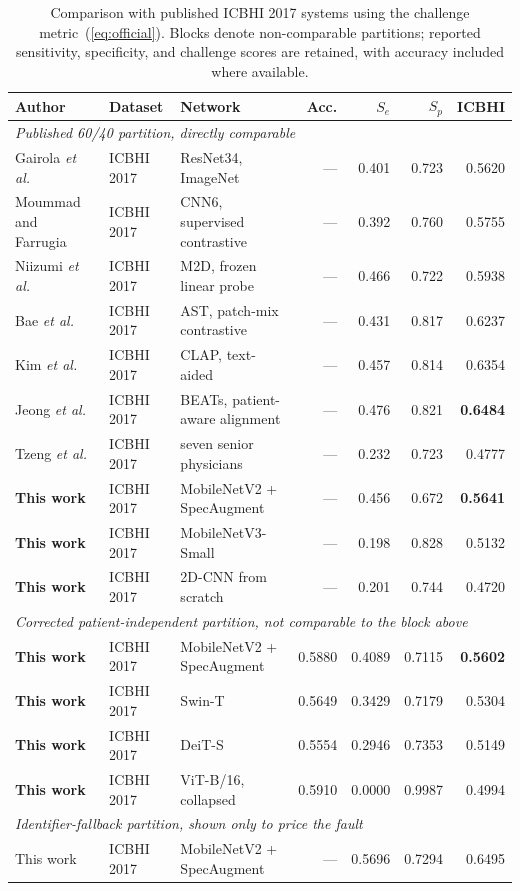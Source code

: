 \documentclass[journal,onecolumn]{IEEEtran}
\newcommand{\best}[1]{\textbf{#1}}
\begin{document}
\begin{table}[hbtp]
\centering
\caption{Comparison with published ICBHI 2017 systems using the challenge metric~(\ref{eq:official}). Blocks denote non-comparable partitions; reported sensitivity, specificity, and challenge scores are retained, with accuracy included where available.}
\label{tab:comparison}
\footnotesize
\begin{tabular}{lllrrrr}
\toprule
Author & Dataset & Network & Acc. & $S_e$ & $S_p$ & \best{ICBHI} \\
\midrule
\multicolumn{7}{l}{\emph{Published 60/40 partition, directly comparable}}\\
Gairola \emph{et al.}~\cite{respirenet2021} & ICBHI 2017 & ResNet34, ImageNet & --- & 0.401 & 0.723 & 0.5620 \\
Moummad and Farrugia~\cite{scl2023} & ICBHI 2017 & CNN6, supervised contrastive & --- & 0.392 & 0.760 & 0.5755 \\
Niizumi \emph{et al.}~\cite{frozenfm2025} & ICBHI 2017 & M2D, frozen linear probe & --- & 0.466 & 0.722 & 0.5938 \\
Bae \emph{et al.}~\cite{bae2023patchmix} & ICBHI 2017 & AST, patch-mix contrastive & --- & 0.431 & 0.817 & 0.6237 \\
Kim \emph{et al.}~\cite{bts2024} & ICBHI 2017 & CLAP, text-aided & --- & 0.457 & 0.814 & 0.6354 \\
Jeong \emph{et al.}~\cite{pafa2025} & ICBHI 2017 & BEATs, patient-aware alignment & --- & 0.476 & 0.821 & \best{0.6484} \\
Tzeng \emph{et al.}~\cite{tzeng2025jmir} & ICBHI 2017 & seven senior physicians & --- & 0.232 & 0.723 & 0.4777 \\
\addlinespace
\best{This work} & ICBHI 2017 & MobileNetV2 + SpecAugment & --- & 0.456 & 0.672 & \best{0.5641} \\
\best{This work} & ICBHI 2017 & MobileNetV3-Small & --- & 0.198 & 0.828 & 0.5132 \\
\best{This work} & ICBHI 2017 & 2D-CNN from scratch & --- & 0.201 & 0.744 & 0.4720 \\
\midrule
\multicolumn{7}{l}{\emph{Corrected patient-independent partition, not comparable to the block above}}\\
\best{This work} & ICBHI 2017 & MobileNetV2 + SpecAugment & 0.5880 & 0.4089 & 0.7115 & \best{0.5602} \\
\best{This work} & ICBHI 2017 & Swin-T & 0.5649 & 0.3429 & 0.7179 & 0.5304 \\
\best{This work} & ICBHI 2017 & DeiT-S & 0.5554 & 0.2946 & 0.7353 & 0.5149 \\
\best{This work} & ICBHI 2017 & ViT-B/16, collapsed & 0.5910 & 0.0000 & 0.9987 & 0.4994 \\
\midrule
\multicolumn{7}{l}{\emph{Identifier-fallback partition, shown only to price the fault}}\\
This work & ICBHI 2017 & MobileNetV2 + SpecAugment & --- & 0.5696 & 0.7294 & 0.6495 \\
\bottomrule
\end{tabular}


\end{table}
\end{document}
